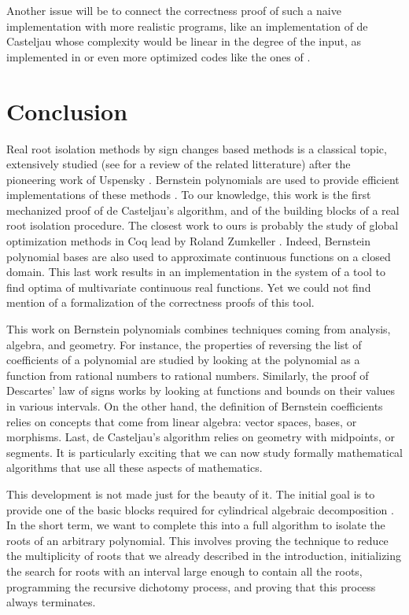 \documentclass{mscs}
\begin{document}
Another issue will be to connect the correctness proof of such a
naive implementation with more realistic programs, like an
implementation of de Casteljau whose complexity would be
linear in the degree of the input, as
implemented in \cite{cadcoq} or even more optimized codes like the
ones of \cite{mourrainetal}.

\section{Conclusion}

Real root isolation methods by sign changes based methods is a
classical topic, extensively studied (see \cite{rouillieretal} for a
review of the related litterature) after the pioneering work of
Uspensky \cite{uspensky}. Bernstein polynomials are used to provide
efficient implementations of these methods
\cite{mourrainetal, rouillieretal}.  To our knowledge, this work is
the first mechanized proof of de Casteljau's algorithm, and of the
building blocks of a real root isolation procedure. The closest work
to ours is probably the study of global optimization methods in Coq
lead by Roland Zumkeller \cite{zumkellerphd}. Indeed, Bernstein
polynomial bases are also used to approximate continuous functions on a
closed domain. This last work results in an implementation in the
\Coq{} system of a tool to find optima of multivariate continuous real
functions. Yet we could not find mention of a formalization of the
correctness proofs of this tool.

This work on Bernstein polynomials combines techniques coming from
analysis, algebra, and geometry. For instance, the properties of
reversing the list of coefficients of a polynomial are studied by
looking at the polynomial as a function from rational numbers to
rational numbers. Similarly, the proof of Descartes' law of signs
works by looking at functions and bounds on their values in various
intervals. On the other hand, the definition of Bernstein coefficients
relies on concepts that come from linear algebra: vector spaces,
bases, or morphisms. Last, de Casteljau's algorithm relies on geometry
with midpoints, or segments. It is particularly exciting that we can
now study formally mathematical algorithms that use all these aspects
of mathematics.

This development is not made just for the beauty of it. The initial
goal is to provide one of the basic blocks required for cylindrical
algebraic decomposition \cite{bpr, cadcoq}. In the short term, we
want to complete this
into a full algorithm to isolate the roots of an arbitrary
polynomial. This involves proving the technique to reduce the
multiplicity of roots that we already described in the introduction,
initializing the search for roots with an interval large enough to
contain all the roots, programming the recursive dichotomy process,
and proving that this process always terminates.
\end{document}
